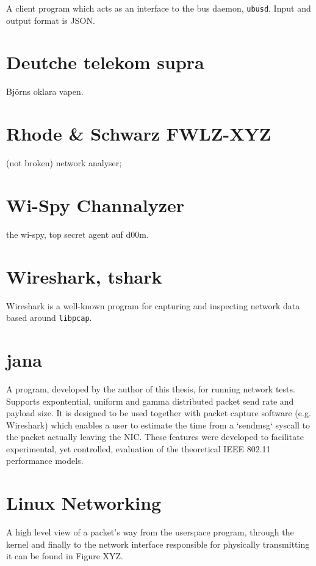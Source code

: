 A client program which acts as an interface to the bus daemon, \texttt{ubusd}.
Input and output format is JSON.

\section{Deutche telekom supra}

Björns oklara vapen.

\section{Rhode \& Schwarz FWLZ-XYZ}

(not broken) network analyser;

\section{Wi-Spy Channalyzer}

the wi-spy, top secret agent auf d00m.

\section{Wireshark, tshark}

Wireshark is a well-known program for capturing and inspecting network data
based around \texttt{libpcap}.

\section{jana}

A program, developed by the author of this thesis, for running network tests.
Supports expontential, uniform and gamma distributed packet send rate and
payload size. It is designed to be used together with packet capture software
(e.g. Wireshark) which enables a user to estimate the time from a `sendmsg`
syscall to the packet actually leaving the NIC. These features were developed to
facilitate experimental, yet controlled, evaluation of the theoretical IEEE
802.11 performance models.

\section{Linux Networking}

A high level view of a packet's way from the userspace program, through the
kernel and finally to the network interface responsible for physically
transmitting it can be found in Figure XYZ.